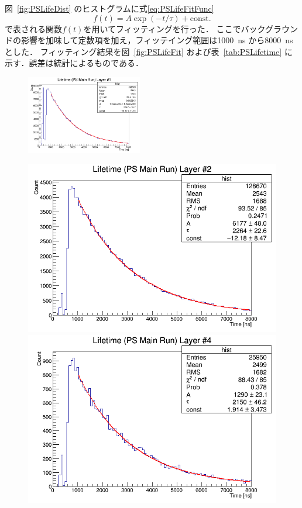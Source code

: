 図~\ref{fig:PSLifeDist} のヒストグラムに式\eqref{eq:PSLifeFitFunc} 
\begin{equation}
f(t) = A \exp(-t / \tau) + \mathrm{const.}
\label{eq:PSLifeFitFunc}
\end{equation}
で表される関数$f(t)$を用いてフィッティングを行った．
ここでバックグラウンドの影響を加味して定数項を加え，フィッテイング範囲は1000~ns から8000~ns とした．
フィッティング結果を図~\ref{fig:PSLifeFit} および表~\ref{tab:PSLifetime} に示す．誤差は統計によるものである．
\begin{figure}[h]
	\centering
	\includegraphics[width = 0.45\textwidth]{figure/odagawa/PSLifetimeFit_Layer0.png}\\
	\begin{minipage}{0.45\textwidth}
	\centering
	\includegraphics[width = \textwidth]{figure/odagawa/PSLifetimeFit_Layer1.png}
	\end{minipage}
	\begin{minipage}{0.45\textwidth}
	\centering
	\includegraphics[width = \textwidth]{figure/odagawa/PSLifetimeFit_Layer3.png}

\end{minipage}
\end{figure}
